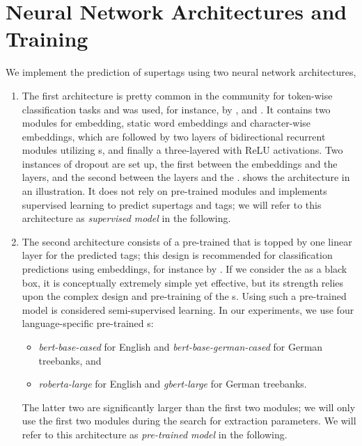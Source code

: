 \documentclass[../../document.tex]{subfiles}
\begin{document}
    \section{Neural Network Architectures and Training}\label{sec:models}
    We implement the prediction of supertags using two neural network architectures, 
    \begin{enumerate}
        \item
            The first architecture is pretty common in the  community for token-wise classification tasks and was used, for instance, by \citet{vaswani2016supertagging}, \citet{StaSte20} and \citet{Cor20}.
            It contains two modules for embedding, static word embeddings and character-wise embeddings, which are followed by two layers of bidirectional recurrent modules utilizing s, and finally a three-layered  with ReLU activations.
            Two instances of dropout are set up, the first between the embeddings and the  layers, and the second between the  layers and the .
             shows the architecture in an illustration.
            It does not rely on pre-trained modules and implements supervised learning to predict supertags and  tags; we will refer to this architecture as \emph{supervised model} in the following.
        \item
            The second architecture consists of a pre-trained  that is topped by one linear layer for the predicted tags; this design is recommended for classification predictions using  embeddings, for instance by \citet{Devlin2019}.
            If we consider the  as a black box, it is conceptually extremely simple yet effective, but its strength relies upon the complex design and pre-training of the s.
            Using such a pre-trained model is considered semi-supervised learning.
            In our experiments, we use four language-specific pre-trained s:
            \begin{itemize}
                \item \emph{bert-base-cased} for English and \emph{bert-base-german-cased} \citep{Devlin2019} for German treebanks, and
                \item \emph{roberta-large} \citep{roberta} for English and \emph{gbert-large} \citep{Cha20} for German treebanks.
            \end{itemize}
            The latter two are significantly larger than the first two modules; we will only use the first two modules during the search for extraction parameters.
            We will refer to this architecture as \emph{pre-trained model} in the following.
    \end{enumerate}
\end{document}
